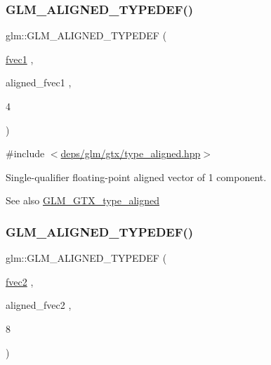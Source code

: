 \subsubsection{\texorpdfstring{G\+L\+M\+\_\+\+A\+L\+I\+G\+N\+E\+D\+\_\+\+T\+Y\+P\+E\+D\+E\+F()}{GLM\_ALIGNED\_TYPEDEF()}\hspace{0.1cm}{\footnotesize\ttfamily [147/209]}}
{\footnotesize\ttfamily glm\+::\+G\+L\+M\+\_\+\+A\+L\+I\+G\+N\+E\+D\+\_\+\+T\+Y\+P\+E\+D\+EF (\begin{DoxyParamCaption}\item[{\hyperlink{group__gtc__type__precision_gaed54853d0f184df0e5fbd9f9118c477b}{fvec1}}]{,  }\item[{aligned\+\_\+fvec1}]{,  }\item[{4}]{ }\end{DoxyParamCaption})}



{\ttfamily \#include $<$\hyperlink{gtx_2type__aligned_8hpp}{deps/glm/gtx/type\+\_\+aligned.\+hpp}$>$}

Single-\/qualifier floating-\/point aligned vector of 1 component. \begin{DoxySeeAlso}{See also}
\hyperlink{group__gtx__type__aligned}{G\+L\+M\+\_\+\+G\+T\+X\+\_\+type\+\_\+aligned} 
\end{DoxySeeAlso}
\mbox{\label{group__gtx__type__aligned_ga2543c05ba19b3bd19d45b1227390c5b4}} 
\subsubsection{\texorpdfstring{G\+L\+M\+\_\+\+A\+L\+I\+G\+N\+E\+D\+\_\+\+T\+Y\+P\+E\+D\+E\+F()}{GLM\_ALIGNED\_TYPEDEF()}\hspace{0.1cm}{\footnotesize\ttfamily [148/209]}}
{\footnotesize\ttfamily glm\+::\+G\+L\+M\+\_\+\+A\+L\+I\+G\+N\+E\+D\+\_\+\+T\+Y\+P\+E\+D\+EF (\begin{DoxyParamCaption}\item[{\hyperlink{group__gtc__type__precision_gaabc3d7a259968a12108c052ff9265148}{fvec2}}]{,  }\item[{aligned\+\_\+fvec2}]{,  }\item[{8}]{ }\end{DoxyParamCaption})}



